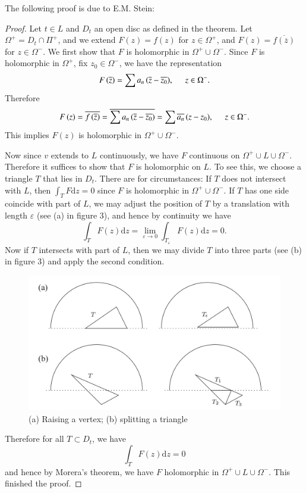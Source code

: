 The following proof is due to E.M. Stein: 
\begin{proof}
Let $t\in L$ and $D_t$ an open disc as defined in the theorem. Let $\Omega^+=D_t\cap\Pi^+$, and we extend $F(z)=f(z)$ for $z\in\Omega^+$, and $F(z)=\overline{f(\overline{z})}$ for $z\in\Omega^-$. We first show that $F$ is holomorphic in $\Omega^+\cup\Omega^-$. Since $F$ is holomorphic in $\Omega^+$, fix $z_0\in\Omega^-$, we have the representation 
$$
F\left( \overline{z} \right) =\sum{a_n\left( \overline{z}-\overline{z_0} \right)},\hspace{0.5cm}z\in \Omega ^-.
$$
Therefore 
$$
F\left( z \right) =\overline{f\left( \overline{z} \right) }=\overline{\sum{a_n\left( \overline{z}-\overline{z_0} \right)}}=\sum{\overline{a_n}\left( z-z_0 \right)},\hspace{0.5cm}z\in \Omega ^-.
$$
This implies $F(z)$ is holomorphic in $\Omega^+\cup\Omega^-$.\par
Now since $v$ extends to $L$ continuously, we have $F$ continuous on $\Omega^+\cup L\cup\Omega^-$. Therefore it suffices to show that $F$ is holomorphic on $L$. To see this, we choose a triangle $T$ that lies in $D_t$. There are for circumstances: If $T$ does not intersect with $L$, then $\int_TF\mathrm{d}z=0$ since $F$ is holomorphic in $\Omega^+\cup\Omega^-$. If $T$ has one side coincide with part of $L$, we may adjust the position of $T$ by a translation with length $\varepsilon$ (see (a) in figure 3), and hence by continuity we have 
$$
\int_T{F\left( z \right) \mathrm{d}z}=\lim_{\varepsilon \rightarrow 0} \int_{T_{\varepsilon}}{F\left( z \right) \mathrm{d}z}=0.
$$
Now if $T$ intersects with part of $L$, then we may divide $T$ into three parts (see (b) in figure 3) and apply the second condition. 
\begin{center}
\begin{figure}[htbp]
    \center
    \includegraphics[scale=0.25]{img/proof of Reflection principle.png}
    \caption{(a) Raising a vertex; (b) splitting a triangle}
\end{figure}
\end{center}
Therefore for all $T\subset D_t$, we have 
$$\int_TF(z)\mathrm{d}z=0$$
and hence by Morera's theorem, we have $F$ holomorphic in $\Omega^+\cup L\cup\Omega^-$. This finished the proof.
\end{proof}
